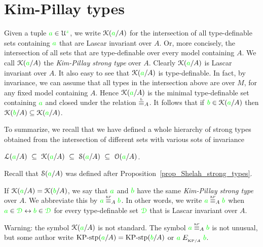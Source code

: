 \section{Kim-Pillay types}\label{KPtypes}

Given a tuple ${\color{green} a}\in\EuScript U^{\color{green} z}$, we write \emph{$\EuScript K({\color{green} a}/A)$\/} for the intersection of all type-definable sets containing ${\color{green} a}$ that are Lascar invariant over $A$.
Or, more concisely, the intersection of all sets that are type-definable over every model containing $A$.
We call $\EuScript K({\color{green} a}/A)$ the \emph{Kim-Pillay strong type\/} over $A$.
Clearly $\EuScript K({\color{green} a}/A)$ is Lascar invariant over $A$.
It also easy to see that $\EuScript K({\color{green} a}/A)$ is type-definable.
In fact, by invariance, we can assume that all types in the intersection above are over $M$, for any fixed model containing $A$.
Hence $\EuScript K({\color{green} a}/A)$ is the minimal type-definable set containing ${\color{green} a}$ and closed under the relation $\equivL_A$.
It follows that if ${\color{green} b}\in\EuScript K({\color{green} a}/A)$ then $\EuScript K({\color{green} b}/A)\subseteq\EuScript K({\color{green} a}/A)$.

To summarize, we recall that we have defined a whole hierarchy of strong types obtained from the intersection of different sets with various sots of invariance

\hfil$\Ll({\gr a}/A)\ \subseteq\ \K({\gr a}/A)\ \subseteq\ \S({\gr a}/A)\ \subseteq\ \Orbit({\gr a}/A)$. 

Recall that $\EuScript S({\color{green} a}/A)$ was defined after Proposition~\ref{prop_Shelah_strong_types}.

If $\EuScript K({\color{green} a}/A)=\EuScript K({\color{green} b}/A)$, we say that ${\color{green} a}$ and ${\color{green} b}$ have the same \emph{Kim-Pillay strong type\/} over $A$.
We abbreviate this by \emph{${\gr a}\stackrel{\smash{\scalebox{.5}{\rm KP}}}{\equiv}_A{\gr b}$.}
In other words, we write ${\gr a}\equivKP_A{\gr b}$ when ${\color{green} a}\in{\color{green}\EuScript D}\leftrightarrow{\color{green}b}\in{\color{green}\EuScript D}$ for every type-definable set ${\color{green}\EuScript D}$ that is Lascar invariant over $A$.


\noindent\llap{\textcolor{red}{\Large\warning}\kern1.5ex}%
Warning: the symbol $\EuScript K({\color{green} a}/A)$ is not standard.
The symbol ${\gr a}\equivKP_A{\gr b}$ is not unusual, but some author write $\mbox{KP-stp}({\color{green} a}/A)=\mbox{KP-stp}({\color{green} b}/A)$ or ${\color{green} a}\mathrel{E_{_{{\rm KP}/A}}}{\color{green} b}$.


